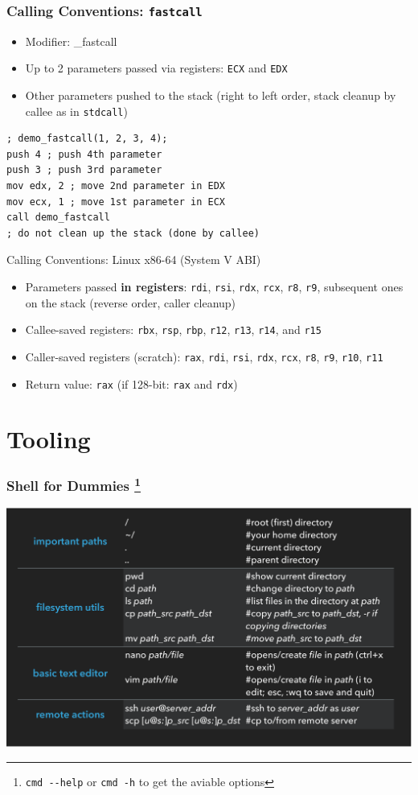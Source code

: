 \documentclass[]{beamer}
\begin{document}
\begin{frame}[fragile]
  \frametitle{Calling Conventions: {\tt fastcall}}
  \begin{itemize}
  \item Modifier: \alert{\_fastcall}
  \item Up to 2 parameters passed via registers: {\tt ECX} and {\tt EDX}
  \item Other parameters pushed to the stack (right to left order, stack cleanup by callee as in {\tt stdcall})
  \end{itemize}
\begin{lstlisting}[language={[x86masm]Assembler}]
; demo_fastcall(1, 2, 3, 4);
push 4 ; push 4th parameter
push 3 ; push 3rd parameter
mov edx, 2 ; move 2nd parameter in EDX
mov ecx, 1 ; move 1st parameter in ECX
call demo_fastcall
; do not clean up the stack (done by callee)
\end{lstlisting}
\end{frame}

\begin{frame}{Calling Conventions: Linux x86-64 (System V ABI)}
\begin{itemize}
\item Parameters passed {\bf in registers}: {\tt rdi}, {\tt rsi}, {\tt rdx}, {\tt rcx}, {\tt r8}, {\tt r9}, subsequent ones on the stack (reverse order, caller cleanup)
\item Callee-saved registers: {\tt rbx}, {\tt rsp}, {\tt rbp}, {\tt r12}, {\tt r13}, {\tt r14}, and {\tt r15}
\item Caller-saved registers (scratch): {\tt rax}, {\tt rdi}, {\tt rsi}, {\tt rdx}, {\tt rcx}, {\tt r8}, {\tt r9}, {\tt r10}, {\tt r11}
\item Return value: {\tt rax} (if 128-bit: {\tt rax} and {\tt rdx})
\end{itemize}
\end{frame}

\section{Tooling}
\begin{frame}
  \frametitle{Shell for Dummies \footnote{\texttt{cmd -{}-help} or \texttt{cmd -h} to get the aviable options}}
  \hspace*{-11mm}
  \includegraphics[width=\paperwidth]{./images/shell_1.pdf}
\end{frame}
\end{document}
